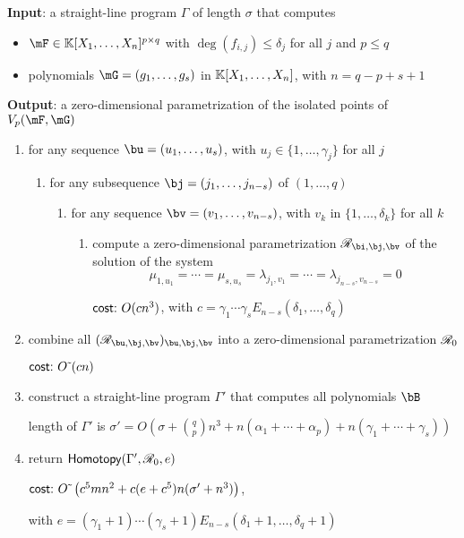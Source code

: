 \documentclass[12pt]{article}
\begin{document}
\begin{algorithm}[h]
\caption{$\mathsf{ColumnDegree}(\Gamma)$}
{\bf Input}: a straight-line program $\Gamma$ of length $\sigma$ that computes 
\begin{itemize}  
\setlength\itemsep{0em}
\item $\mF \in \KK[X_1, \ldots, X_n]^{p \times q}$ with $\deg(f_{i,j}) \leq \delta_j$ for all $j$ and $p \le q$
\item polynomials $\mG = (g_1, \ldots, g_s)$ in $\mathbb{K}[X_1, \ldots, X_n]$, with $n=q-p+s+1$
\end{itemize}
{\bf Output}: a zero-dimensional parametrization of the isolated points of $\VpFG{p}{\mF}{\mG}$
\begin{enumerate}\setlength\itemsep{0em}
\item for any sequence $\bu=(u_1,\dots,u_s)$, with $u_j \in \{1,\dots,\gamma_j\}$ for all $j$
\begin{enumerate}\setlength\itemsep{0em}
\item for any subsequence $\bj=(j_1,\dots,j_{n-s})$ of $(1,\dots,q)$
\begin{enumerate}\setlength\itemsep{0em}
\item for any sequence $\bv=(v_1,\dots,v_{n-s})$, with $v_k$ in $\{1,\dots,\delta_k\}$ for all $k$
\begin{enumerate}\setlength\itemsep{0em}
 \item compute a zero-dimensional parametrization $\scrR_{\bi,\bj,\bv}$ of the solution of the system 
$$\mu_{1,u_1}=\cdots=\mu_{s,u_s}=\lambda_{j_1,v_1}=\cdots=\lambda_{j_{n-s},v_{n-s}}=0$$

\hfill $\text{\sf{cost:~}} O(cn^3)$, with $c=\gamma_1\cdots\gamma_s E_{n-s}(\delta_1,\dots,\delta_q)$
\end{enumerate}
\end{enumerate}
\end{enumerate}
\item combine all $(\scrR_{\bu,\bj,\bv})_{\bu,\bj,\bv}$ into a zero-dimensional parametrization $\mathscr{R}_0$

  \hfill $\text{\sf{cost:~}} {O}{\,\tilde{ }\,}(cn)$

\item construct a straight-line program $\Gamma'$ that computes all polynomials $\bB$

\hfill length of $\Gamma'$ is $\sigma'=O(\sigma + {q \choose p} n^3 + n
(\alpha_1+\cdots+\alpha_p) + n(\gamma_1 + \cdots + \gamma_s))$

\item return $\mathsf{Homotopy}(\Gamma',\mathscr{R}_0,e)$ 

\hfill $\text{\sf{cost:~}} {O}{\,\tilde{ }\,}\left (c^5 m n^2 + c(e+c^5)n (\sigma' + n^3)\right)$, 

\hfill with $e=(\gamma_1+1)\cdots(\gamma_s+1) E_{n-s}(\delta_1+1,\dots,\delta_q+1)$
\end{enumerate}
\label{ColHom}
\end{algorithm}
\end{document}
